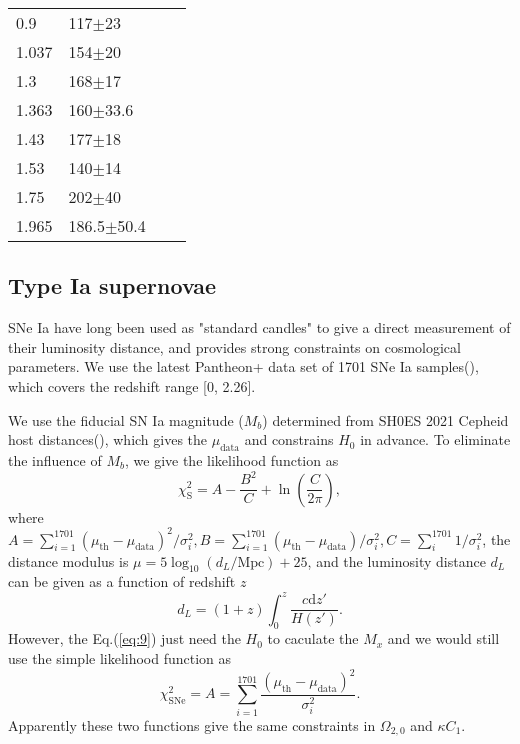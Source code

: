 \documentclass{aa}
\begin{document}
\begin{table}[htbp]
\begin{tabular}{llll}
         0.9 & 117$\pm$23 & \cite{PhysRevD.71.123001} \\
         1.037 & 154$\pm$20 & \cite{M.Moresco_2012} \\
         1.3 & 168$\pm$17 & \cite{PhysRevD.71.123001} \\
         1.363 & 160$\pm$33.6 & \cite{10.1093/mnrasl/slv037} \\
         1.43 & 177$\pm$18 & \cite{PhysRevD.71.123001} \\
         1.53 & 140$\pm$14 & \cite{PhysRevD.71.123001} \\
         1.75 & 202$\pm$40 & \cite{PhysRevD.71.123001} \\
         1.965 & 186.5$\pm$50.4 & \cite{10.1093/mnrasl/slv037} \\
         \hline    
      \end{tabular}
      \label{tab:1}
   \end{table}

\subsection{Type Ia supernovae}

   SNe Ia have long been used as "standard candles" to give a direct
   measurement of their luminosity distance, and provides strong constraints
   on cosmological parameters. We use the latest Pantheon+ data set of 1701 
   SNe Ia samples(\cite{Scolnic_2022}), which covers the redshift range [0, 2.26].
   
   We use the fiducial SN Ia magnitude ($M_b$) determined from SH0ES 2021 Cepheid 
   host distances(\cite{Riess_2022}), which gives the $\mu_\text{data}$ and constrains $H_0$
   in advance. To eliminate the influence of $M_b$, we give the likelihood function
   as \begin{equation}
      \chi_{\text{S}}^2=A-\frac{B^2}{C}+\ln\left(\frac{C}{2\pi}\right),
   \end{equation}
   where $A=\sum_{i=1}^{1701}(\mu_{\text{th}}-\mu_{\text{data}})^2/\sigma_i^2,
   B=\sum_{i=1}^{1701}(\mu_{\text{th}}-\mu_{\text{data}})/\sigma_i^2,C=\sum_i^{1701}1/\sigma_i^2$,
   the distance modulus is $\mu=5\log_{10}(d_L/\text{Mpc})+25$, and the
   luminosity distance $d_L$ can be given as a function of redshift $z$
   \begin{equation}
      d_L=(1+z)\int_0^z\frac{c\mathrm{d}z'}{H(z')}.
   \end{equation}
   However, the Eq.(\ref{eq:9}) just need the $H_0$ to caculate the $M_x$
   and we would still use the simple likelihood function as
   \begin{equation}
      \chi_{\text{SNe}}^2=A=\sum_{i=1}^{1701}\frac{(\mu_{\text{th}}-\mu_{\text{data}})^2}{\sigma_i^2}.
   \end{equation}
   Apparently these two functions give the same constraints in $\Omega_{2,0}$
   and $\kappa C_1$.
\end{document}
